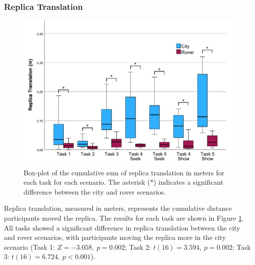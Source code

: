         \subsubsection{Replica Translation}

            
            \begin{figure}[h!]
                \centering
                \includegraphics[width=1\linewidth]{figures/replica_translation_graph.pdf}
                \caption{Box-plot of the cumulative sum of replica translation in meters for each task for each scenario. The asterisk ($\ast$) indicates a significant difference between the city and rover scenarios.}
                \label{fig:task_time}
            \end{figure}

            Replica translation, measured in meters, represents the cumulative distance participants moved the replica. The results for each task are shown in Figure \ref{fig:task_time}. All tasks showed a significant difference in replica translation between the city and rover scenarios, with participants moving the replica more in the city scenario (Task 1: $Z = -3.058,\ p = 0.002$; Task 2: $t(16) = 3.594,\ p = 0.002$; Task 3: $t(16) = 6.724,\ p < 0.001$).

